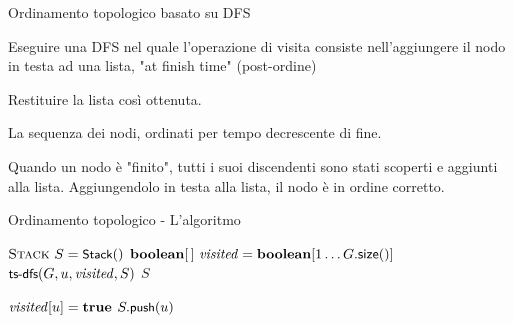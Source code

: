 \begin{frame}{Ordinamento topologico basato su DFS}

\vspace{-6pt}
\BI
\item Eseguire una DFS nel quale l'operazione di visita consiste nell'aggiungere il nodo in testa ad una lista, "at finish time" (post-ordine)
\item Restituire la lista così ottenuta.
\EI

\medskip
{}
\BI
\item La sequenza dei nodi, ordinati per tempo decrescente di fine.
\EI

\medskip
{}
\pause
\BI
\item Quando un nodo è "finito", tutti i suoi discendenti sono stati scoperti e aggiunti alla lista. Aggiungendolo in testa alla lista, il nodo è in ordine corretto.
\EI

\end{frame}

\begin{frame}[shrink=10]{Ordinamento topologico - L'algoritmo}

\vspace{-12pt}
\begin{Procedure}
\caption[A]{\Stack\ \topsort(\Graph $G$)}
$\textsc{Stack}\ S = \textsf{{\small Stack}}()$\;
$\BOOLEAN[\,]\ \mmark = \BOOLEAN[1 \mldots G.\textsf{size}()]$\;
{
  \If{\NOT\ $\mmark[u]$}
  {
    $\textsf{{\small ts-dfs}}(G, u, \mathit{visited}, S)$\;
  }
}
\Return $S$\;
\end{Procedure}

\vspace{-16pt}
\begin{Procedure}
\caption[A]{\topsortdfs(\Graph $G$, \Node\ $u$, $\BOOLEAN[\,]\ \mmark$, \Stack $S$)}
$\mmark[u] = \TRUE$\;
{
}
$S.\textsf{{\small push}}(u)$\;
\end{Procedure}

\end{frame}

